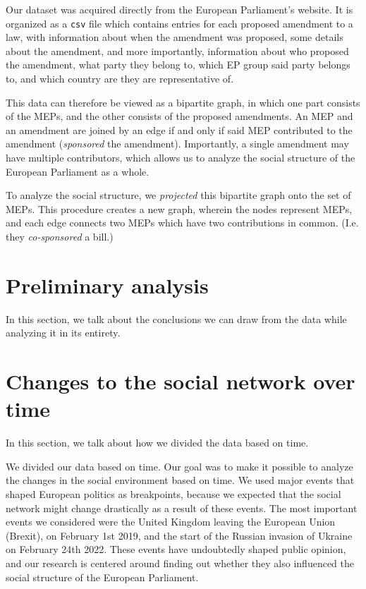 \documentclass[lettersize,journal]{IEEEtran}
\begin{document}
Our dataset was acquired directly from the European Parliament's website. It is organized as a \texttt{csv} file which contains entries for each proposed amendment to a law, with information about when the amendment was proposed, some details about the amendment, and more importantly, information about who proposed the amendment, what party they belong to, which EP group said party belongs to, and which country are they are representative of.

This data can therefore be viewed as a bipartite graph, in which one part consists of the MEPs, and the other consists of the proposed amendments. An MEP and an amendment are joined by an edge if and only if said MEP contributed to the amendment (\textit{sponsored} the amendment). Importantly, a single amendment may have multiple contributors, which allows us to analyze the social structure of the European Parliament as a whole.

To analyze the social structure, we \textit{projected} this bipartite graph onto the set of MEPs. This procedure creates a new graph, wherein the nodes represent MEPs, and each edge connects two MEPs which have two contributions in common. (I.e. they \textit{co-sponsored} a bill.)


\section{Preliminary analysis}

In this section, we talk about the conclusions we can draw from the data while analyzing it in its entirety.

\section{Changes to the social network over time}

In this section, we talk about how we divided the data based on time.

We divided our data based on time. Our goal was to make it possible to analyze the changes in the social environment based on time. We used major events that shaped European politics as breakpoints, because we expected that the social network might change drastically as a result of these events. The most important events we considered were the United Kingdom leaving the European Union (Brexit), on February 1st 2019, and the start of the Russian invasion of Ukraine on February 24th 2022. These events have undoubtedly shaped public opinion, and our research is centered around finding out whether they also influenced the social structure of the European Parliament.
\end{document}
